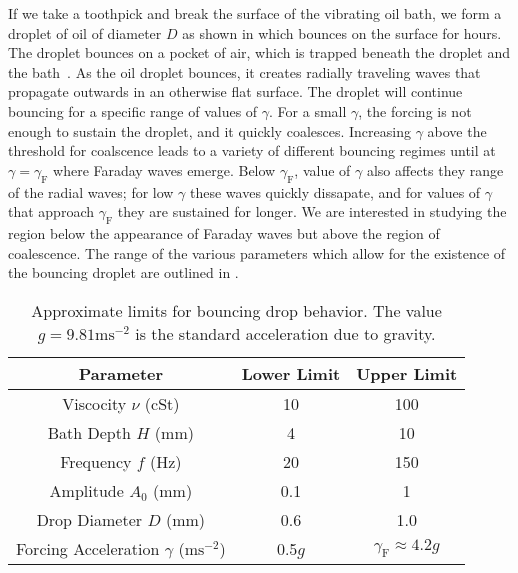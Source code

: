 	    If we take a toothpick and break the surface of the vibrating oil bath, we form a droplet of oil of diameter $D$ as shown in  which bounces on the surface for hours. The droplet bounces on a pocket of air, which is trapped beneath the droplet and the bath~. As the oil droplet bounces, it creates radially traveling waves that propagate outwards in an otherwise flat surface. The droplet will continue bouncing for a specific range of values of $\gamma$. For a small $\gamma$, the forcing is not enough to sustain the droplet, and it quickly coalesces. Increasing $\gamma$ above the threshold for coalscence leads to a variety of different bouncing regimes until at $\gamma = \gamma_\mathrm{F}$ where Faraday waves emerge. Below $\gamma_\mathrm{F}$, value of $\gamma$ also affects they range of the radial waves; for low $\gamma$ these waves quickly dissapate, and for values of $\gamma$ that approach $\gamma_\mathrm{F}$ they are sustained for longer. We are interested in studying the region below the appearance of Faraday waves but above the region of coalescence. The range of the various parameters which allow for the existence of the bouncing droplet are outlined in  \cite{pilot-wave}. 
	      
	       \begin{table}[htdp] 
\caption[Basic Table 1]{Approximate limits for bouncing drop behavior. The value $g = 9.81\mathrm{ms}^{-2}$ is the standard acceleration due to gravity.} 
\begin{center} 
\begin{tabular}{c c c} 
\toprule 
  Parameter &  Lower Limit & Upper Limit \\
  \midrule
Viscocity $\nu$ (cSt) & 10 & 100 \\ 
Bath Depth $H$ (mm) & 4 & 10 \\
Frequency $f$ (Hz) & 20 & 150 \\
Amplitude $A_0$ (mm) & 0.1 & 1 \\
Drop Diameter $D$ (mm) & 0.6 & 1.0 \\
Forcing Acceleration $\gamma$ ($\mathrm{ms}^{-2}$) & 0.5$g$ & $\gamma_\mathrm{F} \approx 4.2g$ \\
\bottomrule 
\end{tabular}
\end{center}
\label{approxlimits} 
\end{table}	

